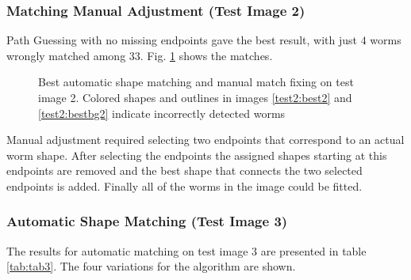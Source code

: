 \subsubsection*{Matching Manual Adjustment (Test Image 2)}

Path Guessing with no missing endpoints gave the best result,
with just $4$ worms wrongly matched among $33$. Fig. \ref{fig:best2} shows the matches.

\begin{figure}[h]
  \centering
\qquad
\qquad
\qquad

\caption[Best automatic shape matching and manual match fixing on test image 2]{Best automatic shape matching and manual match fixing on test image 2. Colored shapes and outlines in images
    \ref{test2:best2} and \ref{test2:bestbg2} indicate incorrectly detected worms}
\label{fig:best2}
\end{figure}

Manual adjustment required selecting two endpoints that correspond to an actual worm shape. After selecting the
endpoints the assigned shapes starting at this endpoints are removed
and the best shape that connects the two selected endpoints is added.
Finally all of the worms in the image could be fitted.


\subsubsection*{Automatic Shape Matching (Test Image 3)}

The results for automatic matching on test image
3 are presented in table \ref{tab:tab3}. The four variations for the algorithm are shown.

